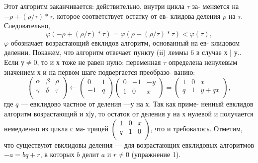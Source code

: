 \begin{myproof}
Этот алгоритм заканчивается: действительно, внутри цикла $\tau$ за- \linebreak меняется на $ -\rho + (\rho / \tau) * \tau$, которое соответствует остатку от ев- \linebreak клидова деления $\rho$ на $\tau$. Следовательно, 
$$\varphi(-\rho + (\rho / \tau) * \tau) = \varphi (\rho - (\rho / \tau) * \tau) < \varphi(\tau),$$
$\varphi$ обозначает возрастающий евклидов алгоритм, основанный на ев- \linebreak клидовом делении.  
Покажем, что алгоритм отвечает пункту (ii) леммы 6 в случае х | у.. Если $у \ne 0$, то и $х$ тоже не равен нулю; переменная $\tau$ определена \linebreak ненулевым значением $х$ и на первом шаге подвергается преобразо- \linebreak ванию:  
$${\left( \begin{array}{ccc}
\alpha & \beta & \rho \\
\gamma & \delta & \tau \\
\end{array} \right)} \gets {\left( \begin{array}{ccc}
0 & 1 \\
-1 & q \\
\end{array} \right)} {\left( \begin{array}{ccc}
0 & -1 & -y \\
1 & 0 & x \\
\end{array} \right)} = {\left( \begin{array}{ccc}
1 & 0 & x \\
q & 1 & y+qx \\
\end{array} \right)},$$
где $q$ — евклидово частное от деления $—у$ на $х$. Так как приме- \linebreak ненный евклидов алгоритм возрастающий и $х | у$, то остаток от \linebreak деления $у$ на $х$ нулевой и получается немедленно из цикла с ма- \linebreak трицей ${\left( \begin{array}{ccc}
1 & 0 & x \\
q & 1 & 0 \\
\end{array} \right)}$, что и требовалось. Отметим, что существуют \linebreak
евклидовы деления --- для возрастающих евклидовых алгоритмов \linebreak  $- a = bq + r$, в которых $b$ делит $a$ и $r \ne 0$ (упражнение 1).  


\end{myproof}
